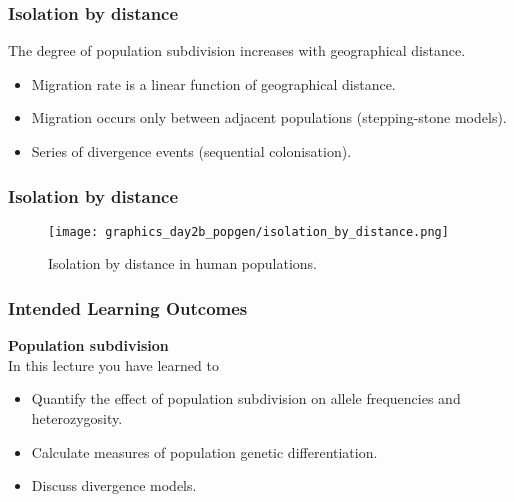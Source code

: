 \documentclass{beamer}
\newcommand{\1}{\ensuremath{\mathbf{1}}}
\begin{document}
%
%
%
\begin{frame}\frametitle{Isolation by distance}
	\begin{block}{}
		The degree of population subdivision increases with geographical distance.
	\end{block}
	\begin{itemize}
		\item Migration rate is a linear function of geographical distance.
		\item Migration occurs only between adjacent populations (stepping-stone models).
		\item Series of divergence events (sequential colonisation).
	\end{itemize}
\end{frame}
%
%
%
\begin{frame}\frametitle{Isolation by distance}
	\begin{figure}
	\begin{center}
		\texttt{[image: graphics\_day2b\_popgen/isolation\_by\_distance.png]}
	\end{center}
	\caption{Isolation by distance in human populations.}
	\end{figure}
\end{frame}
%
%
%
\begin{frame}\frametitle{Intended Learning Outcomes}
	\textbf{Population subdivision}\\[2ex]
	In this lecture you have learned to
	\begin{itemize}
		\item Quantify the effect of population subdivision on allele frequencies and heterozygosity.
		\item Calculate measures of population genetic differentiation.
		\item Discuss divergence models.
	\end{itemize}
\end{frame}
%
%
%
\end{document}
